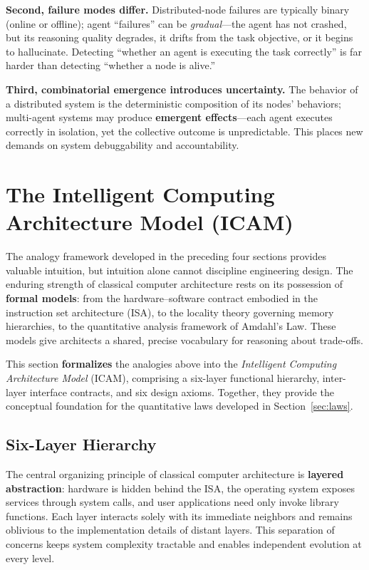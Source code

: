 \documentclass[11pt,a4paper]{article}
\newcounter{axiom}[section]
\begin{document}
\textbf{Second, failure modes differ.}
Distributed-node failures are typically binary (online or offline); agent ``failures'' can be \textit{gradual}---the agent has not crashed, but its reasoning quality degrades, it drifts from the task objective, or it begins to hallucinate.
Detecting ``whether an agent is executing the task correctly'' is far harder than detecting ``whether a node is alive.''

\textbf{Third, combinatorial emergence introduces uncertainty.}
The behavior of a distributed system is the deterministic composition of its nodes' behaviors; multi-agent systems may produce \textbf{emergent effects}---each agent executes correctly in isolation, yet the collective outcome is unpredictable.
This places new demands on system debuggability and accountability.




\section{The Intelligent Computing Architecture Model (ICAM)}
\label{sec:icam}

The analogy framework developed in the preceding four sections provides valuable intuition, but intuition alone cannot discipline engineering design. The enduring strength of classical computer architecture rests on its possession of \textbf{formal models}: from the hardware--software contract embodied in the instruction set architecture (ISA), to the locality theory governing memory hierarchies, to the quantitative analysis framework of Amdahl's Law. These models give architects a shared, precise vocabulary for reasoning about trade-offs.

This section \textbf{formalizes} the analogies above into the \textit{Intelligent Computing Architecture Model} (ICAM), comprising a six-layer functional hierarchy, inter-layer interface contracts, and six design axioms. Together, they provide the conceptual foundation for the quantitative laws developed in Section~\ref{sec:laws}.

\subsection{Six-Layer Hierarchy}
\label{sec:icam-layers}

The central organizing principle of classical computer architecture is \textbf{layered abstraction}: hardware is hidden behind the ISA, the operating system exposes services through system calls, and user applications need only invoke library functions. Each layer interacts solely with its immediate neighbors and remains oblivious to the implementation details of distant layers. This separation of concerns keeps system complexity tractable and enables independent evolution at every level.
\end{document}
